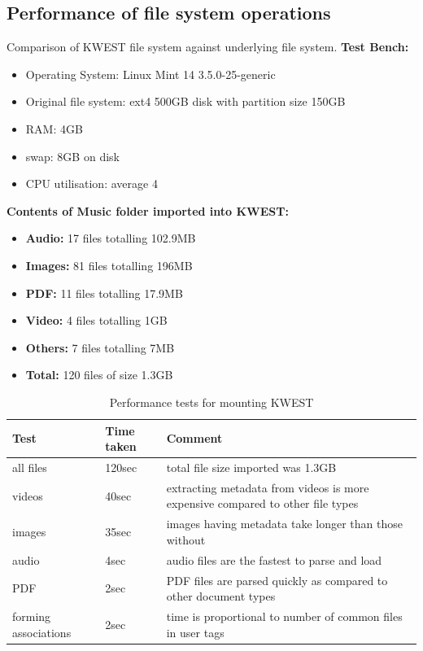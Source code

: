 \newpage
\subsection{Performance of file system operations}
Comparison of KWEST file system against underlying file system.
\textbf{Test Bench:}
\begin{itemize}
\item Operating System: Linux Mint 14 3.5.0-25-generic
\item Original file system: ext4 500GB disk with partition size 150GB
\item RAM: 4GB
\item swap: 8GB on disk
\item CPU utilisation: average 4%
\end{itemize}
\textbf{Contents of Music folder imported into KWEST:}
\begin{itemize}
\item \textbf{Audio:} 17 files totalling 102.9MB
\item \textbf{Images:} 81 files totalling 196MB
\item \textbf{PDF:} 11 files totalling 17.9MB
\item \textbf{Video:} 4 files totalling 1GB
\item \textbf{Others:} 7 files totalling 7MB
\item \textbf{Total:} 120 files of size 1.3GB
\end{itemize}

\begin{table}[h]
\begin{tabular}{|p{3cm}|p{2cm}|p{7cm}|}
\hline
\textbf{Test} & \textbf{Time taken} & \textbf{Comment} \\ \hline
all files	&	120sec	& total file size imported was 1.3GB \\ \hline
videos	& 40sec	&	extracting metadata from videos is more expensive compared to other file types \\ \hline
images	& 35sec & images having metadata take longer than those without \\ \hline
audio 	& 4sec	& audio files are the fastest to parse and load \\ \hline
PDF		& 2sec	& PDF files are parsed quickly as compared to other document types \\ \hline
forming associations & 2sec	 & time is proportional to number of common files in user tags \\
\hline
\end{tabular}
\caption{Performance tests for mounting KWEST}
\label{performancemount}
\end{table}

